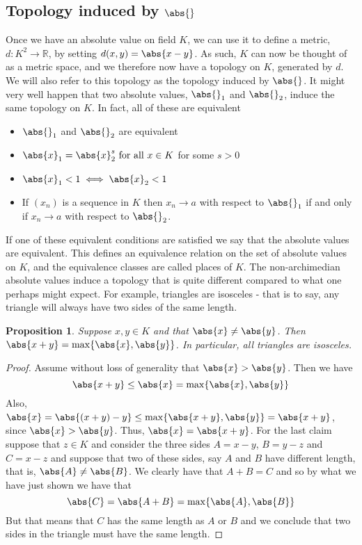 \documentclass{article}
\newtheorem{proposition}{Proposition}[section]
\newcommand{\mbb}[1]{\mathbb{#1}}
\numberwithin{equation}{section}
\begin{document}


\subsection{Topology induced by $\abs{}$}
Once we have an absolute value on field $K$, we can use it to define a metric, $d : K^2 \to \mbb R$, by setting $d(x,y) = \abs{x - y}$. As such, $K$ can now be thought of as a metric space, and we therefore now have a topology on $K$, generated by $d$. We will also refer to this topology as the topology induced by $\abs{}$. It might very well happen that two absolute values, $\abs{}_1$ and $\abs{}_2$, induce the same topology on $K$. In fact, all of these are equivalent
\begin{itemize}
    \item $\abs{}_1$ and $\abs{}_2$ are equivalent
    \item $\abs{x}_1 = \abs{x}_2^s \text{ for all } x\in K$ for some $s > 0$
    \item $\abs{x}_1 < 1 \iff \abs{x}_2 < 1$
    \item If $(x_n)$ is a sequence in $K$ then $x_n \to a$ with respect to $\abs{}_1$ if and only if $x_n \to a$ with respect to $\abs{}_2$.
\end{itemize}
If one of these equivalent conditions are satisfied we say that the absolute values are equivalent. This defines an equivalence relation on the set of absolute values on $K$, and the equivalence classes are called places of $K$. The non-archimedian absolute values induce a topology that is quite different compared to what one perhaps might expect. For example, triangles are isosceles - that is to say, any triangle will always have two sides of the same length.

\begin{proposition}\label{prop: Triangles are isosceles}
    Suppose $x,y \in K$ and that $\abs{x} \neq \abs{y}$. Then $\abs{x + y} = \max \{\abs{x}, \abs{y}\}$. In particular, all triangles are isosceles.
\end{proposition}
\begin{proof}
    Assume without loss of generality that $\abs{x} > \abs{y}$. Then we have
    $$\abs{x + y} \leq \abs{x} = \max \{\abs{x}, \abs{y}\}$$
    Also, $\abs{x} = \abs{(x + y) - y} \leq \max\{\abs{x + y}, \abs{y}\} = \abs{x + y}$, since $\abs{x} > \abs{y}$. Thus, $\abs{x} = \abs{x + y}$. For the last claim suppose that $z \in K$ and consider the three sides $A = x - y$, $B = y - z$ and $C = x-z$ and suppose that two of these sides, say $A$ and $B$ have different length, that is, $\abs{A} \neq \abs{B}$. We clearly have that $A + B = C$ and so by what we have just shown we have that
    $$\abs{C} = \abs{A + B} = \max\{\abs{A}, \abs{B}\}$$
    But that means that $C$ has the same length as $A$ or $B$ and we conclude that two sides in the triangle must have the same length.
\end{proof}
\end{document}
